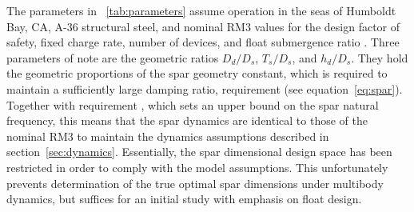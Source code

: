 The parameters in \tablename~\ref{tab:parameters} assume operation in the seas of Humboldt Bay, CA, A-36 structural steel, and nominal RM3 values for the design factor of safety, fixed charge rate, number of devices, and float submergence ratio \cite{RM3}.
Three parameters of note are the geometric ratios $D_d/D_s$, $T_s/D_s$, and $h_d/D_s$.
They hold the geometric proportions of the spar geometry constant, which is required to maintain a sufficiently large damping ratio, requirement  (see equation~\eqref{eq:spar}).
Together with requirement , which sets an upper bound on the spar natural frequency, this means that the spar dynamics are identical to those of the nominal RM3 to maintain the dynamics assumptions described in section~\ref{sec:dynamics}.
Essentially, the spar dimensional design space has been restricted in order to comply with the model assumptions.
This unfortunately prevents determination of the true optimal spar dimensions under multibody dynamics, but suffices for an initial study with emphasis on float design.

